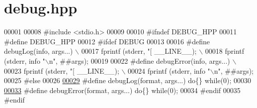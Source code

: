\hypertarget{debug_8hpp_source}{}\section{debug.\+hpp}
\label{debug_8hpp_source}

\begin{DoxyCode}
00001 
00008 \textcolor{preprocessor}{#include <stdio.h>}
00009 
00010 \textcolor{preprocessor}{#ifndef DEBUG\_HPP}
00011 \textcolor{preprocessor}{#define DEBUG\_HPP}
00012 \textcolor{preprocessor}{#ifdef DEBUG}
00013 
00016 \textcolor{preprocessor}{    #define debugLog(info, args...) \(\backslash\)}
00017 \textcolor{preprocessor}{        fprintf (stderr, "[%
       \_\_LINE\_\_); \(\backslash\)}
00018 \textcolor{preprocessor}{        fprintf (stderr, info "\(\backslash\)n", ##args);}
00019 
00022 \textcolor{preprocessor}{    #define debugError(info, args...) \(\backslash\)}
00023 \textcolor{preprocessor}{        fprintf (stderr, "[%
       \_\_LINE\_\_); \(\backslash\)}
00024 \textcolor{preprocessor}{        fprintf (stderr, info "\(\backslash\)n", ##args);}
00025 \textcolor{preprocessor}{#else}
00026 
\hyperlink{debug_8hpp_a55f41cf7b0585224496de3d7adbc101c}{00029} \textcolor{preprocessor}{    #define debugLog(format, args...) do\{\} while(0);}
00030 
\hyperlink{debug_8hpp_a06cd512b8b15b6da31a5a557445f7027}{00033} \textcolor{preprocessor}{    #define debugError(format, args...) do\{\} while(0);}
00034 \textcolor{preprocessor}{#endif}
00035 \textcolor{preprocessor}{#endif}
\end{DoxyCode}
